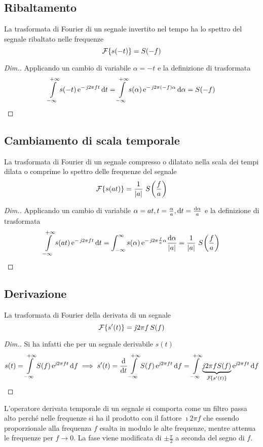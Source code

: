 \subsection{Ribaltamento}
La trasformata di Fourier di un segnale invertito nel tempo ha lo spettro del segnale ribaltato nelle frequenze
\begin{equation}\operatorname{\mathcal{F}}\!\left\lbrace{s(-t)}\right\rbrace=S(-f)\end{equation}
\begin{proof}[Dim.]
Applicando un cambio di variabile $\alpha=-t$ e la definizione di trasformata
\[\int\limits_{-\infty}^{+\infty}{s(-t)\operatorname{e}^{-\operatorname{\mathit{j}\!} 2\pi f t}}{\,\mathop{}\!\mathrm{d}{t}}=
\int\limits_{-\infty}^{+\infty}{s(\alpha)\operatorname{e}^{-\operatorname{\mathit{j}\!} 2\pi (-f)\alpha}}{\,\mathop{}\!\mathrm{d}{\alpha}}=S(-f)\]
\end{proof}

\subsection{Cambiamento di scala temporale}
La trasformata di Fourier di un segnale compresso o dilatato nella scala dei tempi dilata o comprime lo spettro delle frequenze del segnale
\begin{equation}\label{eq:trasf_Fourier_scala}
\operatorname{\mathcal{F}}\!\left\lbrace{s(a t)}\right\rbrace=\frac{1}{\left|{a}\right|}\,\,{S}^{}\!\left({\frac{f}{a}}\right)
\end{equation}
\begin{proof}[Dim.] Applicando un cambio di variabile $\alpha=a t, t=\frac{\alpha}{a}, \mathop{}\!\mathrm{d} t=\frac{\mathop{}\!\mathrm{d}\alpha}{a}$ e la definizione di trasformata
\[\int\limits_{-\infty}^{+\infty}{s(a t)\operatorname{e}^{-\operatorname{\mathit{j}\!} 2\pi f t}}{\,\mathop{}\!\mathrm{d}{t}}=
\int_{-\infty}^{\infty}{s(\alpha)\operatorname{e}^{-\operatorname{\mathit{j}\!} 2\pi\frac{f}{a}\alpha}}{\frac{\mathop{}\!\mathrm{d}\alpha}{\left|{a}\right|}}=\frac{1}{\left|{a}\right|}\,\,{S}^{}\!\left({\frac{f}{a}}\right)\]
\end{proof}

\subsection{Derivazione}
La trasformata di Fourier della derivata di un segnale 
\begin{equation}
\operatorname{\mathcal{F}}\!\left\lbrace{s'(t)}\right\rbrace=\operatorname{\mathit{j}\!} 2\pi f\,S(f)
\end{equation}
\begin{proof}[Dim.] Si ha infatti che per un segnale derivabile $s(t)$
\[s(t)=\intinf{S(f)\e{\imath 2\pi f t}}{f}\implies s'(t)=\deriv{}{t}\intinf{S(f)\e{\imath 2\pi f t}}{f}=
\intinf{ \underbrace{\imath 2\pi f S(f)}_{\fourier{s'(t)}}\e{\imath 2\pi f t}}{f} \]
\end{proof}

\begin{nota}L'operatore derivata temporale di un segnale si comporta come un filtro passa alto perché nelle frequenze si ha il prodotto con il fattore $\imath 2\pi f$ che essendo proporzionale alla frequenza $f$ esalta in modulo le alte frequenze, mentre attenua le frequenze per $f\to 0$. La fase viene modificata di $\pm\frac{\pi}{2}$ a seconda del segno di $f$.\end{nota}

